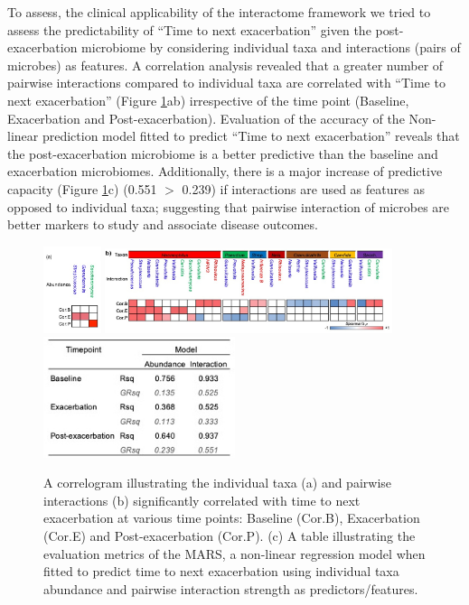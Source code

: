 To assess, the clinical applicability of the interactome framework we tried to assess the predictability of “Time to next exacerbation” given the post-exacerbation microbiome by considering individual taxa and interactions (pairs of microbes) as features. A correlation analysis revealed that a greater number of pairwise interactions compared to individual taxa are correlated with “Time to next exacerbation” (Figure \ref{fig8}ab) irrespective of the time point (Baseline, Exacerbation and Post-exacerbation). Evaluation of the accuracy of the Non-linear prediction model fitted to predict “Time to next exacerbation” reveals that the post-exacerbation microbiome is a better predictive than the baseline and exacerbation microbiomes. Additionally, there is a major increase of predictive capacity (Figure \ref{fig8}c) (0.551 $>$ 0.239) if interactions are used as features as opposed to individual taxa; suggesting that pairwise interaction of microbes are better markers to study and associate disease outcomes.  


\begin{figure}[!htb]
	\centering
	\includegraphics[width=0.15\textwidth]{image/1.jpeg}%
	\includegraphics[width=0.75\textwidth]{image/3.jpeg}
	\includegraphics[width=0.5\textwidth]{image/5.jpeg}
	\caption{A correlogram illustrating the individual taxa (a) and pairwise interactions (b) significantly correlated with time to next exacerbation at various time points: Baseline (Cor.B), Exacerbation (Cor.E) and Post-exacerbation (Cor.P). (c) A table illustrating the evaluation metrics of the MARS, a non-linear regression model when fitted to predict time to next exacerbation using individual taxa abundance and pairwise interaction strength as predictors/features.}
	\label{fig8}
\end{figure}